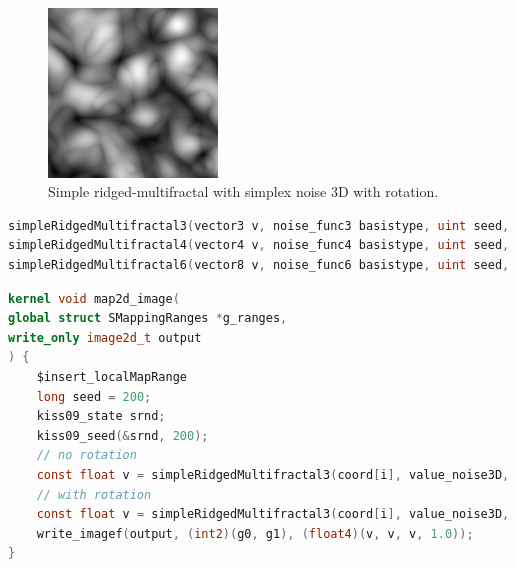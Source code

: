 \begin{figure}[h]
\centering
\includegraphics[width=0.4\textwidth]{out/simpleRidgedMultifractal3/simpleRidgedMultifractal3_simplex_noise3D_noInterp_rot.png}
\caption{Simple ridged-multifractal with simplex noise 3D with rotation.}
\label{fig:simple_redgedmf3_simplex_noise3D_noInterp_rot}
\end{figure}

\begin{lstlisting}[caption={Definition of simple brownian motion fractal functions},label={lst:simple_redgedmf3_definition},language=OpenCL]
simpleRidgedMultifractal3(vector3 v, noise_func3 basistype, uint seed, interp_func interp, random_func rnd, void *srnd, uint numoctaves, REAL frequency, bool rot);
simpleRidgedMultifractal4(vector4 v, noise_func4 basistype, uint seed, interp_func interp, random_func rnd, void *srnd, uint numoctaves, REAL frequency, bool rot);
simpleRidgedMultifractal6(vector8 v, noise_func6 basistype, uint seed, interp_func interp, random_func rnd, void *srnd, uint numoctaves, REAL frequency, bool rot);
\end{lstlisting}

\begin{lstlisting}[caption={Example for simple brownian motion fractal functions},label={lst:simple_redgedmf3_example},language=OpenCL]
kernel void map2d_image(
global struct SMappingRanges *g_ranges,
write_only image2d_t output
) {
    $insert_localMapRange
    long seed = 200;
    kiss09_state srnd;
    kiss09_seed(&srnd, 200);
    // no rotation
    const float v = simpleRidgedMultifractal3(coord[i], value_noise3D, 200, noInterp, random_kiss09, &srnd, 3, 0.125, false);
    // with rotation
    const float v = simpleRidgedMultifractal3(coord[i], value_noise3D, 200, noInterp, random_kiss09, &srnd, 3, 0.125, true);
    write_imagef(output, (int2)(g0, g1), (float4)(v, v, v, 1.0));
}
\end{lstlisting}

